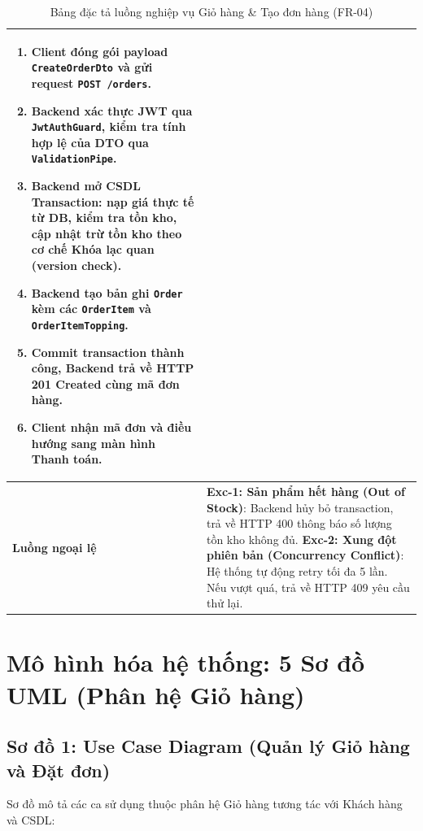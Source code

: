 \documentclass[a4paper]{article}
\begin{document}
\begin{table}[h!]
\begin{tabular}{|p{3.5cm}|p{11.5cm}|}
\begin{enumerate}
    \item Client đóng gói payload \texttt{CreateOrderDto} và gửi request \texttt{POST /orders}.
    \item Backend xác thực JWT qua \texttt{JwtAuthGuard}, kiểm tra tính hợp lệ của DTO qua \texttt{ValidationPipe}.
    \item Backend mở CSDL Transaction: nạp giá thực tế từ DB, kiểm tra tồn kho, cập nhật trừ tồn kho theo cơ chế Khóa lạc quan (version check).
    \item Backend tạo bản ghi \texttt{Order} kèm các \texttt{OrderItem} và \texttt{OrderItemTopping}.
    \item Commit transaction thành công, Backend trả về HTTP 201 Created cùng mã đơn hàng.
    \item Client nhận mã đơn và điều hướng sang màn hình Thanh toán.
    \vspace{-0.2cm}
\end{enumerate} \\ \hline
\textbf{Luồng ngoại lệ} & 
\textbf{Exc-1: Sản phẩm hết hàng (Out of Stock)}: Backend hủy bỏ transaction, trả về HTTP 400 thông báo số lượng tồn kho không đủ. \newline
\textbf{Exc-2: Xung đột phiên bản (Concurrency Conflict)}: Hệ thống tự động retry tối đa 5 lần. Nếu vượt quá, trả về HTTP 409 yêu cầu thử lại. \\ \hline
\end{tabular}
\caption{Bảng đặc tả luồng nghiệp vụ Giỏ hàng \& Tạo đơn hàng (FR-04)}
\end{table}

\newpage
\section{Mô hình hóa hệ thống: 5 Sơ đồ UML (Phân hệ Giỏ hàng)}

\subsection{Sơ đồ 1: Use Case Diagram (Quản lý Giỏ hàng và Đặt đơn)}
Sơ đồ mô tả các ca sử dụng thuộc phân hệ Giỏ hàng tương tác với Khách hàng và CSDL:
\end{document}
